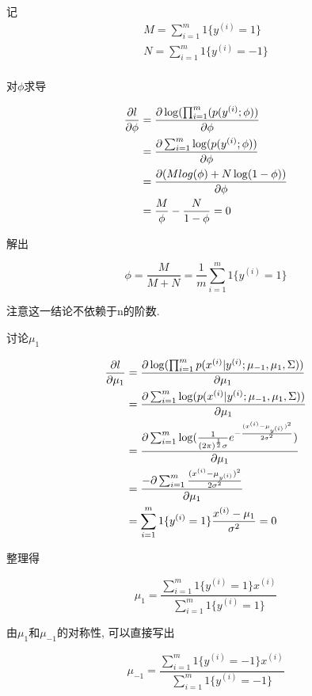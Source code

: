 \documentclass{ctexart}
\begin{document}
记
\begin{align*}
M = \sum_{i=1}^m 1\{y^{(i)} = 1\} \\
N = \sum_{i=1}^m 1\{y^{(i)} = -1\} \\	
\end{align*}

对$\phi$求导

\begin{align}
	\frac{\partial l}{\partial \phi} &= \frac{\partial \log(\prod_{i=1}^m(p(y^{(i)};\phi))}{\partial \phi} \notag \\
	&= \frac{\partial \sum_{i=1}^m \log(p(y^{(i)};\phi))}{\partial \phi} \notag \\
	&= \frac{\partial(Mlog(\phi) + N\log(1-\phi))}{\partial \phi} \notag \\
	&= \frac{M}{\phi} - \frac{N}{1-\phi} = 0 \notag
\end{align}

解出

\begin{equation}
	\phi = \frac{M}{M+N}  =\frac{1}{m}  \sum_{i=1}^m 1\{y^{(i)} = 1\}
\end{equation}

注意这一结论不依赖于n的阶数.

讨论$\mu_1$

\begin{align*}
		\frac{\partial l}{\partial \mu_1} &= \frac{\partial \log(\prod_{i=1}^m p(x^{(i)}|y^{(i)};\mu_{-1},\mu_1,\Sigma))}{\partial \mu_1} \notag \\
		&=  \frac{\partial \sum_{i=1}^m\log( p(x^{(i)}|y^{(i)};\mu_{-1},\mu_1,\Sigma))}{\partial \mu_1} \notag \\
		&=  \frac{\partial \sum_{i=1}^m\log(\frac{1}{(2\pi)^{\frac{1}{2}}\sigma}e^{-\frac{(x^{(i)}-\mu_{y^{(i)}})^2}{2\sigma^2}})}{\partial \mu_1} \notag \\
		&=  \frac{-\partial \sum_{i=1}^m \frac{(x^{(i)} - \mu_{y^{(i)}})^2}{2 \sigma^2}}{\partial \mu_1} \notag \\
		&= \sum_{i = 1}^m 1\{y^{(i)} = 1\}\frac{x^{(i)} - \mu_1}{\sigma^2} = 0
\end{align*}

整理得

\begin{equation}
	\mu_{1} = \frac{\sum_{i=1}^m 1\{y^{(i)} = 1\} x^{(i)}}{\sum_{i=1}^m 1\{y^{(i)} = 1\}}
\end{equation}

由$\mu_1$和$\mu_{-1}$的对称性, 可以直接写出

\begin{equation}
\mu_{-1} = \frac{\sum_{i=1}^m 1\{y^{(i)} = -1\} x^{(i)}}{\sum_{i=1}^m 1\{y^{(i)} = -1\}}
\end{equation}
\end{document}
